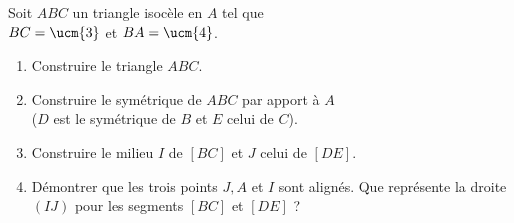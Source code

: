 \begin{colonne*exercice}


\begin{exercice}
   Soit $ABC$ un triangle isocèle en $A$ tel que \\
   $BC=\ucm{3}$ et $BA=\ucm{4}$.
   \begin{enumerate}
      \item Construire le triangle $ABC$.
      \item Construire le symétrique de $ABC$ par apport à $A$ \\
         ($D$ est le symétrique de $B$ et $E$ celui de $C$).
      \item Construire le milieu $I$ de $[BC]$ et $J$ celui de $[DE]$.
      \item Démontrer que les trois points $J, A$ et $I$ sont alignés. Que représente la droite $(IJ)$ pour les segments $[BC]$ et $[DE]$ ?
   \end{enumerate}
\end{exercice}


\end{colonne*exercice}
